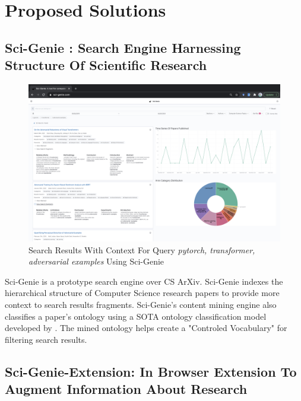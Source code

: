 \chapter{Proposed Solutions}
\label{method}

\section{Sci-Genie : Search Engine Harnessing Structure Of Scientific Research}
\begin{figure}[h]
    \centering
    \includegraphics[width=\maxwidth{\textwidth}]{src/images/sci-genie-context-exp.png}
    \caption{Search Results With Context For Query \textit{pytorch, transformer, adversarial examples} Using Sci-Genie}
    \label{figure\arabic{figurecounter}}
\end{figure}

Sci-Genie is a prototype search engine over CS ArXiv. 
Sci-Genie indexes the hierarchical structure of Computer Science research papers 
to provide more context to search results fragments. 
Sci-Genie's content mining engine also classifies a paper's ontology using a SOTA ontology classification model
developed by \cite{salatino2020ontology}. The mined ontology helps create a "Controled Vocabulary" for filtering 
search results. 

\section{Sci-Genie-Extension: In Browser Extension To Augment Information About Research }

